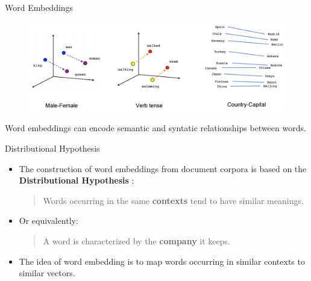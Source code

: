 \documentclass[handout]{beamer}
\begin{document}
\begin{frame}{Word Embeddings}
\begin{figure}[h]
  \includegraphics[scale=0.17]{pics/embeddings.png}
\end{figure}
Word embeddings can encode semantic and syntatic relationships between words.


\end{frame}




\begin{frame}{Distributional Hypothesis}
\begin{scriptsize}
\begin{itemize}
\item The construction of word embeddings from document corpora is based on the  \textbf{Distributional Hypothesis} \cite{harris1954}: \\
\begin{quote}
 Words occurring in the same \textbf{contexts} tend to have similar meanings.
\end{quote}

\item Or equivalently:
\begin{quote}
A word is characterized by the \textbf{company} it keeps.
\end{quote}


\item The idea of word embedding is to map words occurring in similar contexts to similar vectors.

\end{itemize}
\end{scriptsize}
\end{frame}
\end{document}

